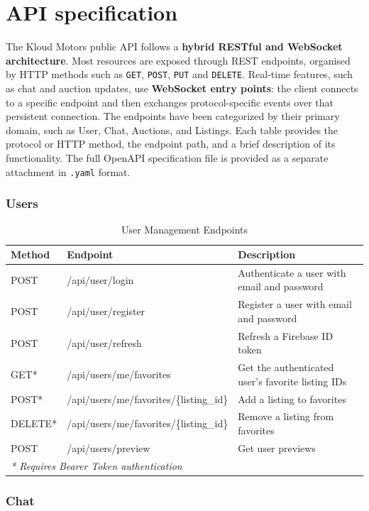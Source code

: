 \chapter{API specification} \label{cap:api}

The Kloud Motors public API follows a \textbf{hybrid RESTful and WebSocket architecture}. Most resources are exposed through REST endpoints, organised by HTTP methods such as \texttt{GET}, \texttt{POST}, \texttt{PUT} and \texttt{DELETE}. Real-time features, such as chat and auction updates, use \textbf{WebSocket entry points}: the client connects to a specific endpoint and then exchanges protocol-specific events over that persistent connection. The endpoints have been categorized by their primary domain, such as User, Chat, Auctions, and Listings. Each table provides the protocol or HTTP method, the endpoint path, and a brief description of its functionality. The full OpenAPI specification file is provided as a separate attachment in \texttt{.yaml} format.

\subsection{Users}
\begin{table}[htpb]
\centering
\begin{tabular}{p{1.8cm} p{6.5cm} p{6.5cm}}
\toprule
\textbf{Method} & \textbf{Endpoint} & \textbf{Description} \\
\midrule
POST & /api/user/login & Authenticate a user with email and password \\
POST & /api/user/register & Register a user with email and password \\
POST & /api/user/refresh & Refresh a Firebase ID token \\
GET* & /api/users/me/favorites & Get the authenticated user's favorite listing IDs \\
POST* & /api/users/me/favorites/\{listing\_id\} & Add a listing to favorites \\
DELETE* & /api/users/me/favorites/\{listing\_id\} & Remove a listing from favorites \\
POST & /api/users/preview & Get user previews \\
\bottomrule
\multicolumn{3}{l}{\small \textit{* Requires Bearer Token authentication}}
\end{tabular}
\caption{User Management Endpoints}
\label{tab:api_users}
\end{table}

\subsection{Chat}

